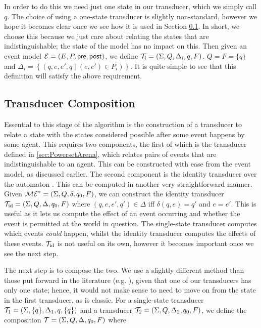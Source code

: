 \documentclass[10pt, a4paper]{report}
\begin{document}
In order to do this we need just one state in our transducer, which we simply
call $q$. The choice of using a one-state transducer is slightly non-standard,
however we hope it becomes clear once we see how it is used in Section
\ref{sec:TransducerComposition}. In short, we choose this because we just care
about relating the states that are indistinguishable; the state of the model has
no impact on this. Then given an event model $\mathcal{E} = (E, P, \textsf{pre}, \textsf{post})$, we
define $\mathcal{T}_i = (\Sigma, Q, \Delta_i, q, F)$. $Q = F = \{q\}$ and $\Delta_i =
\left\{ (q, e, e', q \mid (e, e') \in P_i) \right\}$. It is quite simple to see
that this definition will satisfy the above requirement.

\subsection{Transducer Composition}
\label{sec:TransducerComposition}

Essential to this stage of the algorithm is the construction of a transducer to
relate a state with the states considered possible after some event happens by
some agent. This requires two components, the first of which is the transducer
defined in \ref{sec:PowersetArena}, which relates pairs of events that are
indistinguishable to an agent. This can be constructed with ease from the event
model, as discussed earlier. The second component is the identity transducer
over the automaton \mestar. This can be computed in another very straightforward
manner. Given $\mathcal{ME}^\ast = (\Sigma, Q, \delta, q_0, F)$, we can construct the
identity transducer $\mathcal{T}_{\text{id}} = (\Sigma, Q, \Delta, q_0, F)$ where
$(q, e, e', q') \in \Delta$ iff $\delta(q, e) = q'$ and $e = e'$. This is useful
as it lets us compute the effect of an event occurring and whether the event is
permitted at the world in question. The single-state transducer computes which
events \emph{could} happen, whilst the identity transducer computes the effects
of these events. $\mathcal{T}_{\text{id}}$ is not useful on its own, however it
becomes important once we see the next step.

The next step is to compose the two. We use a slightly different method than
those put forward in the literature (e.g. \cite{ComposingFSTs}), given that one of
our transducers has only one state; hence, it would not make sense to need to
move on from the state in the first transducer, as is classic. For a
single-state transducer $\mathcal{T}_1 = (\Sigma, \{q\}, \Delta_1, q, \{q\})$ and
a transducer $\mathcal{T}_2 = (\Sigma, Q, \Delta_2, q_0, F)$, we define the
composition $\mathcal{T} = (\Sigma, Q, \Delta, q_0, F)$ where 
\end{document}
